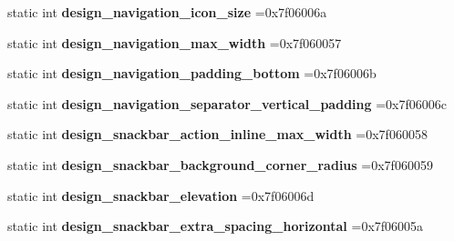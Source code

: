 \begin{DoxyCompactItemize}
static int {\bfseries design\+\_\+navigation\+\_\+icon\+\_\+size} =0x7f06006a
\item 
\mbox{\label{classandroid_1_1support_1_1v7_1_1recyclerview_1_1R_1_1dimen_a1db5b1a9626694e8f2eec039163ba541}} 
static int {\bfseries design\+\_\+navigation\+\_\+max\+\_\+width} =0x7f060057
\item 
\mbox{\label{classandroid_1_1support_1_1v7_1_1recyclerview_1_1R_1_1dimen_a3a2c383828be8b86714f068e4becf628}} 
static int {\bfseries design\+\_\+navigation\+\_\+padding\+\_\+bottom} =0x7f06006b
\item 
\mbox{\label{classandroid_1_1support_1_1v7_1_1recyclerview_1_1R_1_1dimen_a65cf0621fd46e0cb33b4cdd91f257f63}} 
static int {\bfseries design\+\_\+navigation\+\_\+separator\+\_\+vertical\+\_\+padding} =0x7f06006c
\item 
\mbox{\label{classandroid_1_1support_1_1v7_1_1recyclerview_1_1R_1_1dimen_a8f4d57a6bf54a5dc6897b3fa2e58e65b}} 
static int {\bfseries design\+\_\+snackbar\+\_\+action\+\_\+inline\+\_\+max\+\_\+width} =0x7f060058
\item 
\mbox{\label{classandroid_1_1support_1_1v7_1_1recyclerview_1_1R_1_1dimen_a7bdbc1d16188314e644a12510365186b}} 
static int {\bfseries design\+\_\+snackbar\+\_\+background\+\_\+corner\+\_\+radius} =0x7f060059
\item 
\mbox{\label{classandroid_1_1support_1_1v7_1_1recyclerview_1_1R_1_1dimen_a76397f93df8fc0e2f8ca3a2f7304d1a7}} 
static int {\bfseries design\+\_\+snackbar\+\_\+elevation} =0x7f06006d
\item 
\mbox{\label{classandroid_1_1support_1_1v7_1_1recyclerview_1_1R_1_1dimen_aa821cc11b62d753a9ceedc3acbf208ca}} 
static int {\bfseries design\+\_\+snackbar\+\_\+extra\+\_\+spacing\+\_\+horizontal} =0x7f06005a
\item 
\mbox{\label{classandroid_1_1support_1_1v7_1_1recyclerview_1_1R_1_1dimen_ad2d13c079cd77f647858c76692a8c5df}} 

\end{DoxyCompactItemize}
